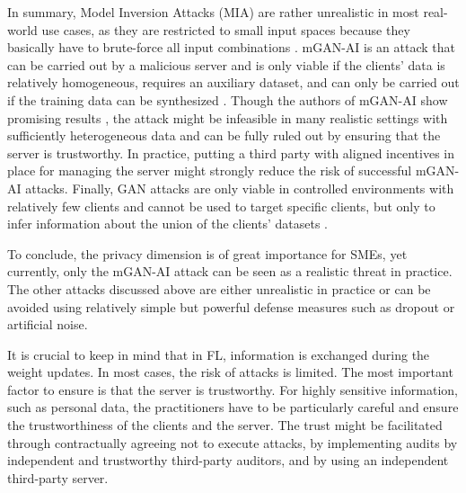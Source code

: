 In summary, Model Inversion Attacks (MIA) \citep{fredrikson2014privacyMIA} are rather unrealistic in most real-world use cases, as they are restricted to small input spaces because they basically have to brute-force all input combinations \citep{enthoven2021overview}.
mGAN-AI \citep{wang2019mGANAI} is an attack that can be carried out by a malicious server and is only viable if the clients' data is relatively homogeneous, requires an auxiliary dataset, and can only be carried out if the training data can be synthesized \citep{enthoven2021overview}. Though the authors of mGAN-AI show promising results \citep{wang2019mGANAI}, the attack might be infeasible in many realistic settings with sufficiently heterogeneous data and can be fully ruled out by ensuring that the server is trustworthy. In practice, putting a third party with aligned incentives in place for managing the server might strongly reduce the risk of successful mGAN-AI attacks.
Finally, GAN \citep{hitaj2017deepGAN, wang2019mGANAI} attacks are only viable in controlled environments with relatively few clients and cannot be used to target specific clients, but only to infer information about the union of the clients' datasets \citep{enthoven2021overview}.

To conclude, the privacy dimension is of great importance for SMEs, yet currently, only the mGAN-AI attack can be seen as a realistic threat in practice. The other attacks discussed above are either unrealistic in practice or can be avoided using relatively simple but powerful defense measures such as dropout or artificial noise.

It is crucial to keep in mind that in FL, information is exchanged during the weight updates. In most cases, the risk of attacks is limited. The most important factor to ensure is that the server is trustworthy. For highly sensitive information, such as personal data, the practitioners have to be particularly careful and ensure the trustworthiness of the clients and the server. The trust might be facilitated through contractually agreeing not to execute attacks, by implementing audits by independent and trustworthy third-party auditors, and by using an independent third-party server.

